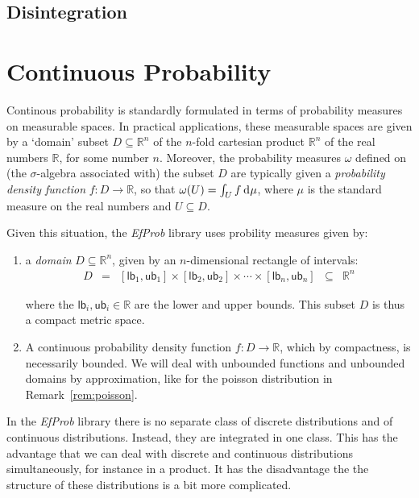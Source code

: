\documentclass[leqno]{tufte-book} %
\newcommand{\EfProb}{\textit{EfProb}\xspace}
\newcommand{\RN}{\mathbb{R}}     %
\newcommand{\lb}{\mathsf{lb}}
\newcommand{\ub}{\mathsf{ub}}
\newcommand{\intd}{{\kern.2em}\mathrm{d}{\kern.03em}}
\begin{document}
\section{Disintegration}\label{sec:disintegration}



\chapter{Continuous Probability}\label{ch:cp}

Continous probability is standardly formulated in terms of probability
measures on measurable spaces. In practical applications, these
measurable spaces are given by a `domain' subset $D \subseteq \RN^{n}$
of the $n$-fold cartesian product $\RN^{n}$ of the real numbers $\RN$,
for some number $n$. Moreover, the probability measures $\omega$
defined on (the $\sigma$-algebra associated with) the subset $D$ are
typically given a \emph{probability density function} $f\colon D
\rightarrow \RN$, so that $\omega(U) = \int_{U} f \intd \mu$, where
$\mu$ is the standard measure on the real numbers and $U\subseteq D$.

Given this situation, the \EfProb library uses probility
measures given by:
\begin{enumerate}
\item a \emph{domain} $D \subseteq \RN^{n}$, given by an
  $n$-dimensional rectangle of intervals:
$$\begin{array}{rcccl}
D
& = &
[\lb_{1}, \ub_{1}] \times [\lb_{2}, \ub_{2}] \times \cdots \times
   [\lb_{n}, \ub_{n}]
& \subseteq &
\RN^{n}
\end{array}$$

\noindent where the $\lb_{i},\ub_{i}\in\RN$ are the lower and upper
bounds. This subset $D$ is thus a compact metric space.

\item A continuous probability density function $f\colon D \rightarrow
  \RN$, which by compactness, is necessarily bounded. We will deal
  with unbounded functions and unbounded domains by approximation,
  like for the poisson distribution in Remark~\ref{rem:poisson}.
\end{enumerate}

\noindent In the \EfProb library there is no separate class of
discrete distributions and of continuous distributions. Instead, they
are integrated in one class. This has the advantage that we can deal
with discrete and continuous distributions simultaneously, for
instance in a product. It has the disadvantage the the structure of
these distributions is a bit more complicated.
\end{document}
